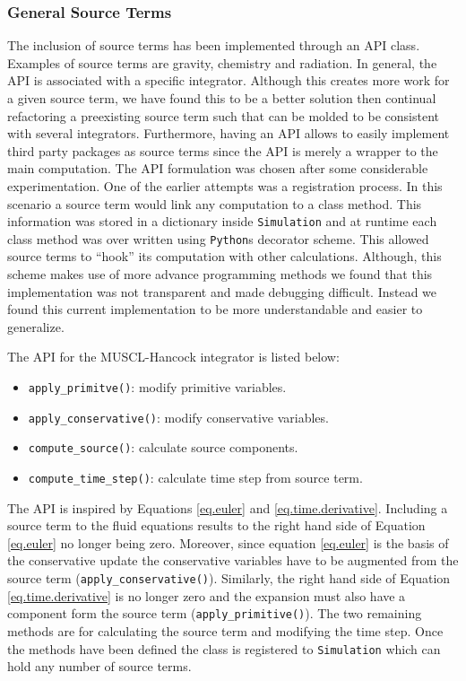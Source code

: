 \subsubsection{General Source Terms}
The inclusion of source terms has been implemented through an
API class. Examples of source terms are gravity, chemistry and radiation.
In general, the API is associated with a specific integrator.
Although this creates more work for a given source term, we have found this to be a better
solution then continual refactoring a preexisting source term such that can be molded to
be consistent with several integrators. Furthermore, having an API allows to easily implement
third party packages as source terms since the API is merely a wrapper to the main computation.
The API formulation was chosen after some considerable experimentation. One of the
earlier attempts was a registration process. In this scenario a source term
would link any computation to a class method. This information was stored
in a dictionary inside \lstinline{Simulation} and at runtime each class method
was over written using \texttt{Python}s decorator scheme. This allowed source terms to ``hook''
its computation with other calculations. Although, this scheme makes
use of more advance programming methods we found that this implementation was
not transparent and made debugging difficult. Instead we
found this current implementation to be more understandable and easier to
generalize.

The API for the MUSCL-Hancock integrator is listed below:
\begin{itemize}
    \item \lstinline{apply_primitve()}: modify primitive variables.
    \item \lstinline{apply_conservative()}: modify conservative variables.
    \item \lstinline{compute_source()}: calculate source components.
    \item \lstinline{compute_time_step()}: calculate time step from source term.
\end{itemize}
The API is inspired by Equations \ref{eq.euler} and \ref{eq.time.derivative}.
Including a source term to the fluid equations results to the right hand side of Equation
\ref{eq.euler} no longer being zero. Moreover, since equation
\ref{eq.euler} is the basis of the conservative update the conservative variables have
to be augmented from the source term (\lstinline{apply_conservative()}). Similarly,
the right hand side of Equation \ref{eq.time.derivative} is no longer zero and the
expansion must also have a component form the source term (\lstinline{apply_primitive()}).
The two remaining methods are for calculating the source term and modifying the time
step. Once the methods have been defined the class is registered to
\lstinline{Simulation} which can hold any number of source terms.

